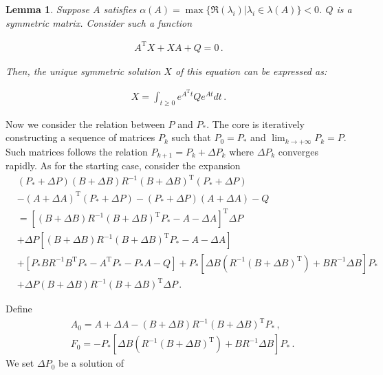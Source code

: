 \documentclass{article}
\newtheorem{lemma}[theorem]{Lemma}
\theoremstyle{definition}
\begin{document}
\begin{lemma}\label{lem:solution}
	Suppose $A$ satisfies $\alpha(A)=\max\{\Re(\lambda_{i})\vert \lambda_{i}\in \lambda(A)\}<0$. $Q$ is a symmetric matrix. Consider such a function
	
	\begin{align}\label{eq:equation}
	A^{\mathrm{T}}X+XA+Q=0\,.
	\end{align}
	
	Then, the unique symmetric solution $X$ of this equation can be expressed as:
	
	\begin{align}\label{eq:solution}
	X=\int_{t\geq0}e^{A^{\mathrm{T}}t}Qe^{At}dt\,.
	\end{align}
\end{lemma}

Now we consider the relation between $P$ and $P_{*}$. The core is iteratively constructing a sequence of matrices $P_{k}$ such that $P_{0}=P_{*}$ and $\lim_{k\to+\infty}P_{k}=P$. Such matrices follows the relation $P_{k+1}=P_{k}+\Delta P_{k}$ where $\Delta P_{k}$ converges rapidly. As for the starting case, consider the expansion
\begin{align*}
&(P_{*}+\Delta P)(B+\Delta B)R^{-1}(B+\Delta B)^{\mathrm{T}}(P_{*}+\Delta P)\\
&-(A+\Delta A)^{\mathrm{T}}(P_{*}+\Delta P)-(P_{*}+\Delta P)(A+\Delta A)-Q\\
&=\left[(B+\Delta B)R^{-1}(B+\Delta B)^{\mathrm{T}}P_{*}-A-\Delta A\right]^{\mathrm{T}}\Delta P\\
&+\Delta P\left[(B+\Delta B)R^{-1}(B+\Delta B)^{\mathrm{T}}P_{*}-A-\Delta A\right]\\
&+\left[P_{*}BR^{-1}B^{\mathrm{T}}P_{*}-A^{\mathrm{T}}P_{*}-P_{*}A-Q\right]+P_{*}\left[\Delta B\left(R^{-1}(B+\Delta B)^{\mathrm{T}}\right)+BR^{-1}\Delta B\right]P_{*}\\
&+\Delta P(B+\Delta B)R^{-1}(B+\Delta B)^{\mathrm{T}}\Delta P\,.
\end{align*}

Define
\begin{align*}
&A_{0}=A+\Delta A-(B+\Delta B)R^{-1}(B+\Delta B)^{\mathrm{T}}P_{*}\,,\\& F_{0}=-P_{*}\left[\Delta B\left(R^{-1}(B+\Delta B)^{\mathrm{T}}\right)+BR^{-1}\Delta B\right]P_{*}\,. 
\end{align*}
We set $\Delta P_{0}$ be a solution of
\end{document}
